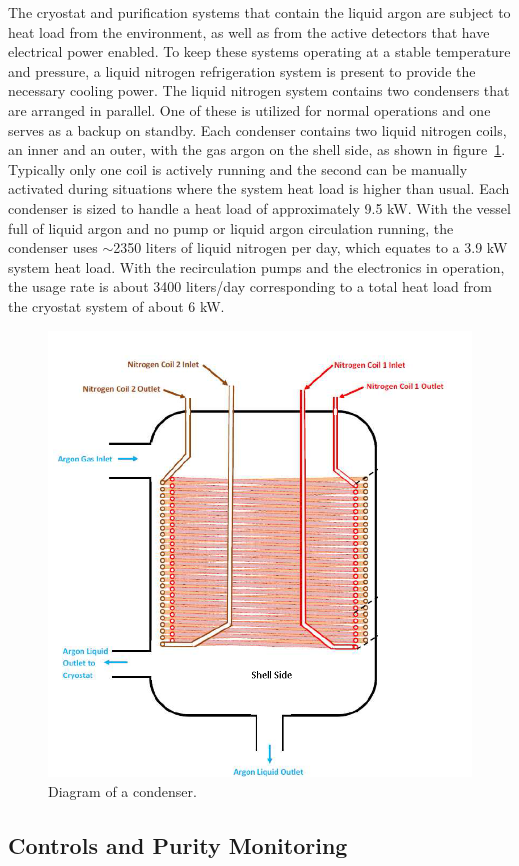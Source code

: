The cryostat and purification systems that contain the liquid argon are subject to heat load from the environment, as well as from the active detectors that have electrical power enabled.  To keep these systems operating at a stable temperature and pressure, a liquid nitrogen refrigeration system is present to provide the necessary cooling power.  The liquid nitrogen system contains two condensers that are arranged in parallel.  One of these is utilized for normal operations and one serves as a backup on standby.  Each condenser contains two liquid nitrogen coils, an inner and an outer, with the gas argon on the shell side, as shown in figure~\ref{fig:condenser}.  Typically only one coil is actively running and the second can be manually activated during situations where the system heat load is higher than usual.  Each condenser is sized to handle a heat load of approximately 9.5 kW.  With the vessel full of liquid argon and no pump or liquid argon circulation running, the condenser uses $\sim$2350 liters of liquid nitrogen per day, which equates to a 3.9 kW system heat load.  With the recirculation pumps and the electronics in operation, the usage rate is about 3400 liters/day corresponding to a total heat load from the cryostat system of about 6 kW.  
\begin{figure}[htb]
\centering	
\includegraphics[width=0.75\linewidth]{figures/condenser.png}
\caption{Diagram of a condenser.}
\label{fig:condenser}
\end{figure}



\subsection{Controls and Purity Monitoring}

